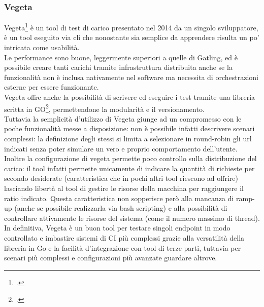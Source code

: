 \subsubsection{Vegeta}
Vegeta\footcite{site:vegeta} è un tool di test di carico presentato nel 2014 da un singolo sviluppatore, è un tool eseguito via \gls{cli} che nonostante sia semplice da apprendere risulta un po' intricata come usabilità. \\
Le performance sono buone, leggermente superiori a quelle di Gatling, ed è possibile creare tanti carichi tramite infrastruttura distribuita anche se la funzionalità non è inclusa nativamente nel software ma necessita di orchestrazioni esterne per essere funzionante. \\
Vegeta offre anche la possibilità di scrivere ed eseguire i test tramite una libreria scritta in GO\footcite{site:golang}, permettendone la modularità e il versionamento. \\
Tuttavia la semplicità d'utilizzo di Vegeta giunge ad un compromesso con le poche funzionalità messe a disposizione: non è possibile infatti descrivere scenari complessi: la definizione degli stessi si limita a selezionare in round-robin gli url indicati senza poter simulare un vero e proprio comportamento dell'utente. \\
Inoltre la configurazione di vegeta permette poco controllo sulla distribuzione del carico: il tool infatti permette unicamente di indicare la quantità di richieste per secondo desiderate (caratteristica che in pochi altri tool riescono ad offrire) lasciando libertà al tool di gestire le risorse della macchina per raggiungere il ratio indicato. Questa caratteristica non sopperisce però alla mancanza di ramp-up (anche se possibile realizzarla via bash scripting) e alla possibilità di controllare attivamente le risorse del sistema (come il numero massimo di thread). \\
In definitiva, Vegeta è un buon tool per testare singoli endpoint in modo controllato e imbastire sistemi di CI più complessi grazie alla versatilità della libreria in Go e la facilità d'integrazione con tool di terze parti, tuttavia per scenari più complessi e configurazioni più avanzate guardare altrove.
